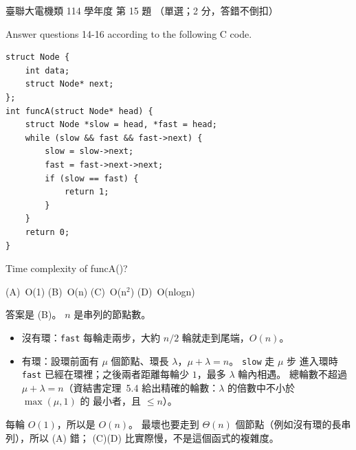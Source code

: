 \begin{pastexam}[label={px:ust-114-ee-ds-15}]{臺聯大電機類 114 學年度 第 15 題}
（單選；2 分，答錯不倒扣）

Answer questions 14-16 according to the following C code.
\begin{verbatim}
struct Node {
    int data;
    struct Node* next;
};
int funcA(struct Node* head) {
    struct Node *slow = head, *fast = head;
    while (slow && fast && fast->next) {
        slow = slow->next;
        fast = fast->next->next;
        if (slow == fast) {
            return 1;
        }
    }
    return 0;
}
\end{verbatim}

Time complexity of funcA()?

(A)~O(1) \qquad (B)~O(n) \qquad (C)~O(n$^2$) \qquad (D)~O(nlogn)
\end{pastexam}

\begin{pastsoln}
答案是 (B)。 $n$ 是串列的節點數。
\begin{itemize}
\item 沒有環：\texttt{fast} 每輪走兩步，大約 $n/2$ 輪就走到尾端，$O(n)$。
\item 有環：設環前面有 $\mu$ 個節點、環長 $\lambda$，$\mu + \lambda = n$。 \texttt{slow} 走 $\mu$ 步
進入環時 \texttt{fast} 已經在環裡；之後兩者距離每輪少 $1$，最多 $\lambda$ 輪內相遇。 總輪數不超過
$\mu + \lambda = n$（資結書定理~5.4 給出精確的輪數：$\lambda$ 的倍數中不小於 $\max(\mu, 1)$ 的
最小者，且 $\le n$）。
\end{itemize}
每輪 $O(1)$，所以是 $O(n)$。 最壞也要走到 $\Theta(n)$ 個節點（例如沒有環的長串列），所以 (A) 錯；
(C)(D) 比實際慢，不是這個函式的複雜度。
\end{pastsoln}
